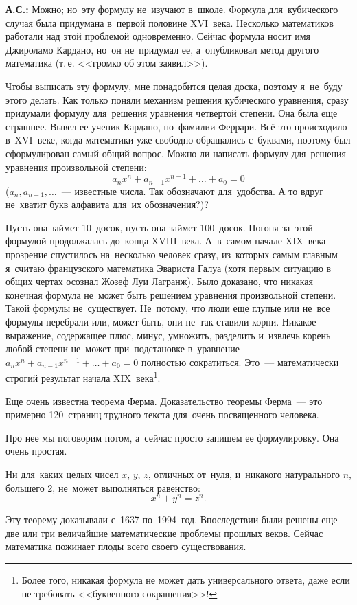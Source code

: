 \textbf{А.С.:} Можно; но~эту формулу не~изучают в~школе. Формула для~кубического случая была
придумана в~первой половине XVI~века. Несколько математиков работали над этой проблемой
одновременно. Сейчас формула носит имя Джироламо Кардано, но~он не~придумал ее, а~опубликовал метод
другого математика (т.\,е. <<громко об этом заявил>>).

Чтобы выписать эту формулу, мне понадобится целая доска, поэтому я~не~буду этого делать. Как только
поняли механизм решения кубического уравнения, сразу придумали формулу для~решения уравнения
четвертой степени. Она была еще страшнее. Вывел ее ученик Кардано, по~фамилии Феррари. Всё это
происходило в~XVI~веке, когда математики уже свободно обращались с~буквами, поэтому был
сформулирован самый общий вопрос. Можно ли написать формулу для~решения уравнения произвольной
степени:
$$
a_{n}x^{n}+a_{n-1}x^{n-1}+\ldots+a_{0}=0
$$
($a_{n}, a_{n-1},\ldots$~--- известные числа. Так обозначают для~удобства. А то вдруг не~хватит букв алфавита для~их обозначения?)?

Пусть она займет 10~досок, пусть она займет 100~досок. Погоня за~этой формулой продолжалась
до~конца XVIII~века. А~в~самом начале XIX~века прозрение спустилось на~несколько человек сразу,
из~которых самым главным я~считаю французского математика Эвариста Галуа (хотя первым ситуацию в общих чертах осознал Жозеф Луи Лагранж).
 Было доказано, что
никакая конечная формула не~может быть решением уравнения произвольной степени. Такой формулы
не~существует. Не~потому, что люди еще глупые или не~все формулы перебрали или, может быть, они
не~так ставили корни. Никакое выражение, содержащее плюс, минус, умножить, разделить и~извлечь
корень любой степени не~может при~подстановке в~уравнение $a_{n}x^{n}+a_{n-1}x^{n-1}+\ldots+a_{0}=0$ полностью
сократиться. Это~--- математически строгий результат начала XIX~века\footnote{Более того, никакая формула не может дать универсального ответа, даже если не требовать <<буквенного сокращения>>!}.

Еще очень известна теорема Ферма. Доказательство теоремы Ферма~--- это примерно 120~страниц
трудного текста для~очень посвященного человека.

Про нее мы поговорим потом, а~сейчас просто запишем ее формулировку. Она очень простая.

Ни для~каких целых чисел $x$, $y$, $z$, отличных от~нуля, и~никакого натурального $n$, большего 2,
не~может выполняться равенство:
$$
x^{n}+y^{n}=z^{n}.
$$

Эту теорему доказывали с~1637 по~1994~год. Впоследствии были решены еще две или три величайшие
математические проблемы прошлых веков. Сейчас математика пожинает плоды всего своего существования.

